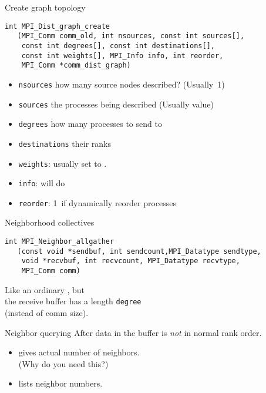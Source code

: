 \begin{numberedframe}{Create graph topology}
\lstset{language=C}
\begin{lstlisting}
int MPI_Dist_graph_create
   (MPI_Comm comm_old, int nsources, const int sources[],
    const int degrees[], const int destinations[], 
    const int weights[], MPI_Info info, int reorder,
    MPI_Comm *comm_dist_graph)
\end{lstlisting}
\begin{itemize}
\item \lstinline{nsources} how many source nodes described? (Usually~1)
\item \lstinline{sources} the processes being described (Usually
   value)
\item \lstinline{degrees} how many processes to send to
\item \lstinline{destinations} their ranks
\item \lstinline{weights}: usually set to .
\item \lstinline{info}:  will do
\item \lstinline{reorder}: 1~if dynamically reorder processes
\end{itemize}
\end{numberedframe}

\begin{numberedframe}{Neighborhood collectives}
\begin{lstlisting}
int MPI_Neighbor_allgather
   (const void *sendbuf, int sendcount,MPI_Datatype sendtype,
    void *recvbuf, int recvcount, MPI_Datatype recvtype,
    MPI_Comm comm)
\end{lstlisting}
Like an ordinary , but\\
the receive buffer has a length \lstinline{degree}\\
(instead of comm size).
\end{numberedframe}

\begin{numberedframe}{Neighbor querying}
  \label{sl:graph-neighbors}
  After  data in the buffer
  is \emph{not} in normal rank order.
  \begin{itemize}
  \item {} gives actual number of neighbors.\\
    (Why do you need this?)
  \item 
     lists neighbor numbers.
  \end{itemize}
\end{numberedframe}

